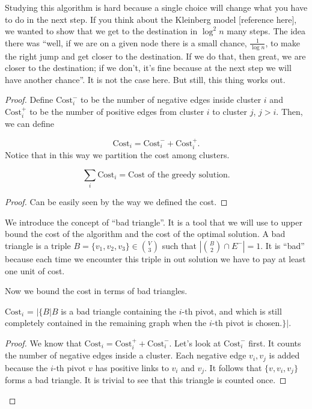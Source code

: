 Studying this algorithm is hard because a single choice will change what you have to do in the next step. If you think about the Kleinberg model [reference here], we wanted to show that we get to the destination in $\log^2n$ many steps. The idea there was ``well, if we are on a given node there is a small chance, $\frac{1}{\log n}$, to make the right jump and get closer to the destination. If we do that, then great, we are closer to the destination; if we don't, it's fine because at the next step we will have another chance''. It is not the case here. But still, this thing works out.

\begin{proof}
	Define $\text{Cost}_i^-$ to be the number of negative edges inside cluster $i$ and $\text{Cost}_i^+$ to be the number of positive edges from cluster $i$ to cluster $j$, $j >  i$. Then, we can define
	
	\begin{equation}
	\text{Cost}_i = \text{Cost}_i^- + \text{Cost}_i^+.
	\end{equation}
Notice that in this way we partition the cost among clusters.
	\begin{lem}
		\begin{equation}
		\sum_i \text{Cost}_i = \text{Cost of the greedy solution.}
		\end{equation}
	\end{lem}
	\begin{proof}
		Can be easily seen by the way we defined the cost.
	\end{proof}
	We introduce the concept of ``bad triangle''. It is a tool that we will use to upper bound the cost of the algorithm and the cost of the optimal solution. A bad triangle is a triple $B = \{v_1, v_2, v_3\} \in \binom{V}{3}$ such that $|\binom{B}{2} \cap E^-| = 1$. It is ``bad'' because each time we encounter this triple in out solution we have to pay at least one unit of cost.
	
	Now we bound the cost in terms of bad triangles.
	
	\begin{lem}
		\begin{center}
			$\text{Cost}_i$ = $|\{B | B $ is a bad triangle containing the $i$-th pivot, and which is still completely contained in the remaining graph when the $i$-th pivot is chosen.$\}|$. 
		\end{center}
	\end{lem}
	\begin{proof}
		We know that $\text{Cost}_i = \text{Cost}_i^+ + \text{Cost}_i^-$. Let's look at $\text{Cost}^-_i$ first. It counts the number of negative edges inside a cluster. Each negative edge ${v_i, v_j}$ is added because the $i$-th pivot $v$ has positive links to $v_i$ and $v_j$. It follows that $\{v, v_i, v_j\}$ forms a bad triangle. It is trivial to see that this triangle is counted once.
		

\end{proof}
\end{proof}
